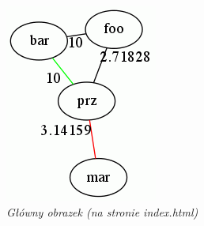 \documentclass[a4paper, 12pt]{article}
\begin{document}
\begin{figure}[ht]
\begin{minipage}[b]{0.45\linewidth}
\centering
\includegraphics[width=\textwidth]{picture1.png}
\caption{\em Główny obrazek (na stronie index.html)}
\label{fig:picture1}
\end{minipage}
\hspace{0.5cm}
\begin{minipage}[b]{0.45\linewidth}
\centering

\end{minipage}
\end{figure}
\end{document}
